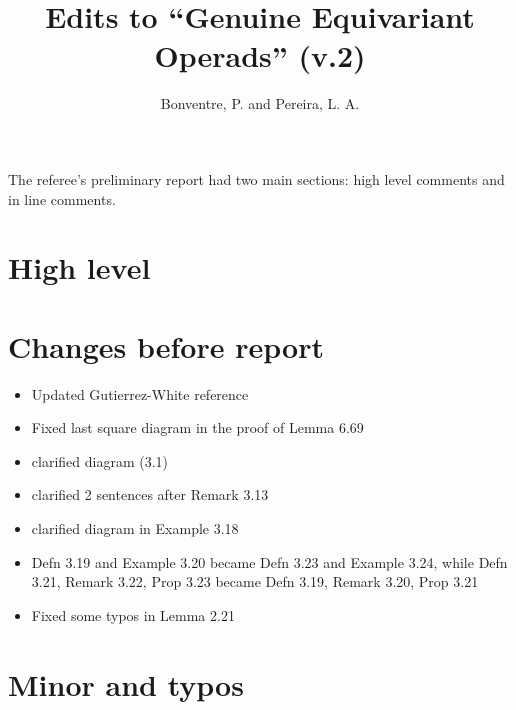 \documentclass{article}
\begin{document}
 
 
\title{Edits to ``Genuine Equivariant Operads'' (v.2)
\\[12pt]} %
 
\author{Bonventre, P. and Pereira, L. A.}
 
\maketitle
 
The referee's preliminary report had two main sections:
high level comments and in line comments.



\section{High level}


\section{Changes before report}

\begin{itemize}
\item Updated Gutierrez-White reference

\item Fixed last square diagram in the proof of Lemma 6.69

\item clarified diagram (3.1)

\item clarified 2 sentences after Remark 3.13

\item clarified diagram in Example 3.18

\item Defn 3.19 and Example 3.20 became Defn 3.23 and Example 3.24, while 
Defn 3.21, Remark 3.22, Prop 3.23 became Defn 3.19, Remark 3.20, Prop 3.21

\item Fixed some typos in Lemma 2.21
\end{itemize}




\section{Minor and typos} 
\end{document}
